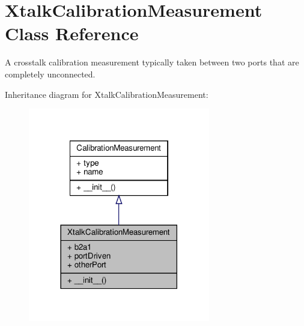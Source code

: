 \hypertarget{classSignalIntegrity_1_1Measurement_1_1Calibration_1_1CalibrationMeasurements_1_1XtalkCalibrationMeasurement}{}\section{Xtalk\+Calibration\+Measurement Class Reference}
\label{classSignalIntegrity_1_1Measurement_1_1Calibration_1_1CalibrationMeasurements_1_1XtalkCalibrationMeasurement}


A crosstalk calibration measurement typically taken between two ports that are completely unconnected.  




Inheritance diagram for Xtalk\+Calibration\+Measurement\+:\nopagebreak
\begin{figure}[H]
\begin{center}
\leavevmode
\includegraphics[width=225pt]{classSignalIntegrity_1_1Measurement_1_1Calibration_1_1CalibrationMeasurements_1_1XtalkCalibrationMeasurement__inherit__graph}
\end{center}
\end{figure}


